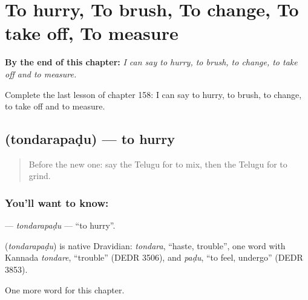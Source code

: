 
\chapter{To hurry, To brush, To change, To take off, To measure}
\label{ch:te-to-hurry-to-brush-to-change-to-take-off-to-measure}

\begin{chapteropening}
\textbf{By the end of this chapter:} \emph{I can say to hurry, to brush, to change, to take off and to measure.}

Complete the last lesson of chapter 158: I can say to hurry, to brush, to change, to take off and to measure.
\end{chapteropening}

\section[\texorpdfstring{\te{తొందరపడు} (tondarapaḍu)}{తొందరపడు (tondarapaḍu)}]{ (tondarapaḍu) — to hurry}

\label{lesson:TE-C158-tondarapadu}



\begin{quote}
Before the new one: say the Telugu for to mix, then the Telugu for to grind.
\end{quote}

\subsection*{You'll want to know: }
\textbf{} — \emph{tondarapaḍu} — \textquotedblleft{}to hurry\textquotedblright{}.

\begin{cousinweb}
\textbf{} (\emph{tondarapaḍu}) is native Dravidian: \emph{tondara}, \textquotedblleft{}haste, trouble\textquotedblright{}, one word with Kannada \emph{tondare}, \textquotedblleft{}trouble\textquotedblright{} (DEDR 3506), and \emph{paḍu}, \textquotedblleft{}to feel, undergo\textquotedblright{} (DEDR 3853).
\end{cousinweb}

\begin{grammarlens}[title={What you've built}]
One more word for this chapter.
\end{grammarlens}

